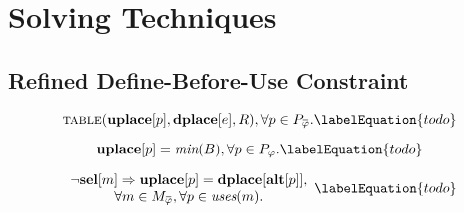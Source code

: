 %

\chapter{Solving Techniques}




\section{Refined Define-Before-Use Constraint}




%
%

\begin{equation}
  \mTable(\mVar{uplace}[p], \mVar{dplace}[e], \mDomMatrix),
  \forall p \in \mPhiOperandCompSet.
  \labelEquation{todo}
\end{equation}

\begin{equation}
  \mVar{uplace}[p] = \mMin(\mBlockSet),
  \forall p \in \mPhiOperandSet.
  \labelEquation{todo}
\end{equation}

\begin{equation}
  \begin{array}{c}
    \neg\mVar{sel}[m] \mImp \mVar{uplace}[p] = \mVar{dplace}[\mVar{alt}[p]], \\
    \forall m \in \mPhiMatchCompSet,
    \forall p \in \mUses(m).
  \end{array}
  \labelEquation{todo}
\end{equation}

